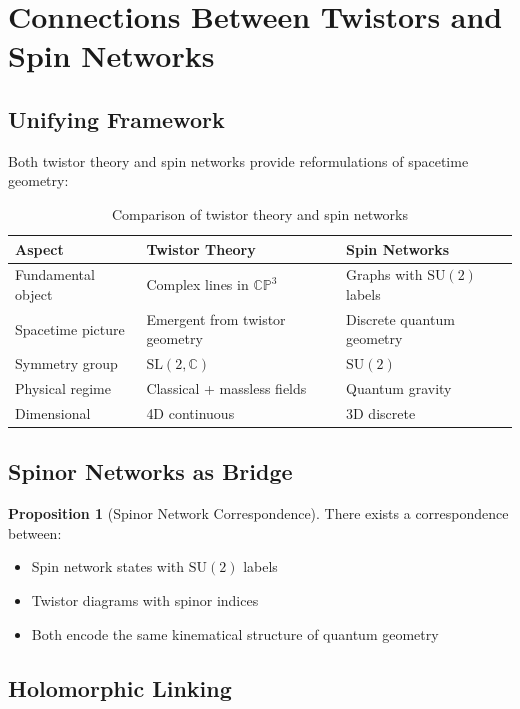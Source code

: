 \documentclass[12pt,a4paper]{article}
\theoremstyle{definition}
\newtheorem{proposition}[theorem]{Proposition}
\newcommand{\C}{\mathbb{C}}
\newcommand{\CP}{\mathbb{CP}}
\newcommand{\SU}{\mathrm{SU}}
\newcommand{\SL}{\mathrm{SL}}
\begin{document}
\section{Connections Between Twistors and Spin Networks}

\subsection{Unifying Framework}

Both twistor theory and spin networks provide reformulations of spacetime geometry:

\begin{table}[H]
\centering
\begin{tabular}{|l|l|l|}
\hline
\textbf{Aspect} & \textbf{Twistor Theory} & \textbf{Spin Networks} \\
\hline
Fundamental object & Complex lines in $\CP^3$ & Graphs with $\SU(2)$ labels \\
\hline
Spacetime picture & Emergent from twistor geometry & Discrete quantum geometry \\
\hline
Symmetry group & $\SL(2,\C)$ & $\SU(2)$ \\
\hline
Physical regime & Classical + massless fields & Quantum gravity \\
\hline
Dimensional & 4D continuous & 3D discrete \\
\hline
\end{tabular}
\caption{Comparison of twistor theory and spin networks}
\end{table}

\subsection{Spinor Networks as Bridge}

\begin{proposition}[Spinor Network Correspondence]
There exists a correspondence between:
\begin{itemize}
    \item Spin network states with $\SU(2)$ labels
    \item Twistor diagrams with spinor indices
    \item Both encode the same kinematical structure of quantum geometry
\end{itemize}
\end{proposition}

\subsection{Holomorphic Linking}
\end{document}
